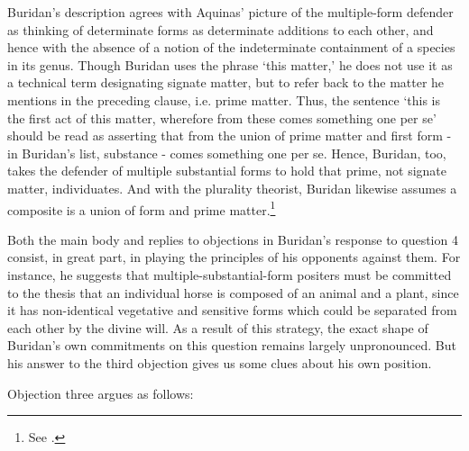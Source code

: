 \documentclass[]{article}
\begin{document}
Buridan's description agrees with Aquinas' picture of the multiple-form defender as thinking of determinate forms as determinate additions to each other, and hence with the absence of a notion of the indeterminate containment of a species in its genus. Though Buridan uses the phrase `this matter,' he does not use it as a technical term designating signate matter, but to refer back to the matter he mentions in the preceding clause, i.e. prime matter. Thus, the sentence `this is the first act of this matter, wherefore from these comes something one per se' should be read as asserting that from the union of prime matter and first form - in Buridan's list, substance - comes something one per se. Hence, Buridan, too, takes the defender of multiple substantial forms to hold that prime, not signate matter, individuates. And with the plurality theorist, Buridan likewise assumes a composite is a union of form and prime matter.\footnote{See \autocite[II.7.25; III.6, 1st argument contra]{BuridanQDA}.}

Both the main body and replies to objections in Buridan's response to question 4 consist, in great part, in playing the principles of his opponents against them. For instance, he suggests that multiple-substantial-form positers must be committed to the thesis that an individual horse is composed of an animal and a plant, since it has non-identical vegetative and sensitive forms which could be separated from each other by the divine will.\autocite[II.4.16]{BuridanQDA}  As a result of this strategy, the exact shape of Buridan's own commitments on this question remains largely unpronounced. But his answer to the third objection gives us some clues about his own position.

Objection three argues as follows:
	
\end{document}
